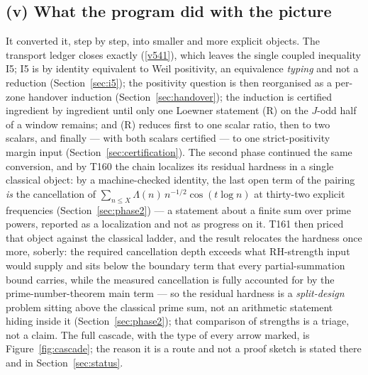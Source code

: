 \documentclass[11pt,a4paper]{article}
\begin{document}
\subsection{(v) What the program did with the picture}
It converted it, step by step, into smaller and more explicit objects. The transport ledger closes
exactly (\vref{v541}), which leaves the single coupled inequality I5; I5 is by identity equivalent to
Weil positivity, an equivalence \emph{typing} and not a reduction (Section~\ref{sec:i5}); the positivity
question is then reorganised as a per-zone handover induction (Section~\ref{sec:handover}); the
induction is certified ingredient by ingredient until only one Loewner statement (R) on the $J$-odd half
of a window remains; and (R) reduces first to one scalar ratio, then to two scalars, and finally ---
with both scalars certified --- to one strict-positivity margin input
(Section~\ref{sec:certification}). The second phase continued the same conversion, and by T160 the
chain localizes its residual hardness in a single classical object: by a machine-checked identity, the
last open term of the pairing \emph{is} the cancellation of
$\sum_{n\le X}\Lambda(n)\,n^{-1/2}\cos(t\log n)$ at thirty-two explicit frequencies
(Section~\ref{sec:phase2}) --- a statement about a finite sum over prime powers, reported as a
localization and not as progress on it. T161 then priced that object against the classical
ladder, and the result relocates the hardness once more, soberly: the required cancellation
depth exceeds what RH-strength input would supply and sits below the boundary term that every
partial-summation bound carries, while the measured cancellation is fully accounted for by the
prime-number-theorem main term --- so the residual hardness is a \emph{split-design} problem
sitting above the classical prime sum, not an arithmetic statement hiding inside it
(Section~\ref{sec:phase2}); that comparison of strengths is a triage, not a claim. The full
cascade, with the type of every arrow marked, is Figure~\ref{fig:cascade}; the reason it is a route and
not a proof sketch is stated there and in Section~\ref{sec:status}.
\end{document}
